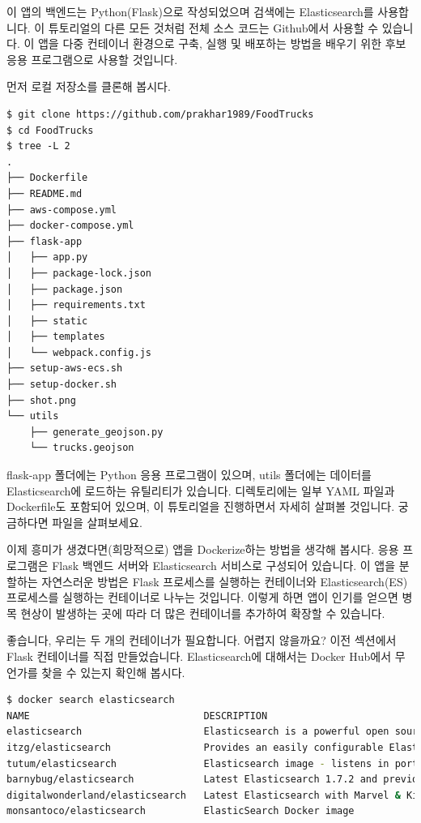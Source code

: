 이 앱의 백엔드는 Python(Flask)으로 작성되었으며 검색에는 Elasticsearch를 사용합니다. 이 튜토리얼의 다른 모든 것처럼 전체 소스 코드는 Github에서 사용할 수 있습니다. 이 앱을 다중 컨테이너 환경으로 구축, 실행 및 배포하는 방법을 배우기 위한 후보 응용 프로그램으로 사용할 것입니다.

먼저 로컬 저장소를 클론해 봅시다.
\begin{verbatim}
$ git clone https://github.com/prakhar1989/FoodTrucks
$ cd FoodTrucks
$ tree -L 2
.
├── Dockerfile
├── README.md
├── aws-compose.yml
├── docker-compose.yml
├── flask-app
│   ├── app.py
│   ├── package-lock.json
│   ├── package.json
│   ├── requirements.txt
│   ├── static
│   ├── templates
│   └── webpack.config.js
├── setup-aws-ecs.sh
├── setup-docker.sh
├── shot.png
└── utils
    ├── generate_geojson.py
    └── trucks.geojson
\end{verbatim}

flask-app 폴더에는 Python 응용 프로그램이 있으며, utils 폴더에는 데이터를 Elasticsearch에 로드하는 유틸리티가 있습니다. 디렉토리에는 일부 YAML 파일과 Dockerfile도 포함되어 있으며, 이 튜토리얼을 진행하면서 자세히 살펴볼 것입니다. 궁금하다면 파일을 살펴보세요.

이제 흥미가 생겼다면(희망적으로) 앱을 Dockerize하는 방법을 생각해 봅시다. 응용 프로그램은 Flask 백엔드 서버와 Elasticsearch 서비스로 구성되어 있습니다. 이 앱을 분할하는 자연스러운 방법은 Flask 프로세스를 실행하는 컨테이너와 Elasticsearch(ES) 프로세스를 실행하는 컨테이너로 나누는 것입니다. 이렇게 하면 앱이 인기를 얻으면 병목 현상이 발생하는 곳에 따라 더 많은 컨테이너를 추가하여 확장할 수 있습니다.

좋습니다, 우리는 두 개의 컨테이너가 필요합니다. 어렵지 않을까요? 이전 섹션에서 Flask 컨테이너를 직접 만들었습니다. Elasticsearch에 대해서는 Docker Hub에서 무언가를 찾을 수 있는지 확인해 봅시다.
\begin{lstlisting}[language=bash]
$ docker search elasticsearch
NAME                              DESCRIPTION                                     STARS     OFFICIAL   AUTOMATED
elasticsearch                     Elasticsearch is a powerful open source se...   697       [OK]
itzg/elasticsearch                Provides an easily configurable Elasticsea...   17                   [OK]
tutum/elasticsearch               Elasticsearch image - listens in port 9200.     15                   [OK]
barnybug/elasticsearch            Latest Elasticsearch 1.7.2 and previous re...   15                   [OK]
digitalwonderland/elasticsearch   Latest Elasticsearch with Marvel & Kibana       12                   [OK]
monsantoco/elasticsearch          ElasticSearch Docker image                      9                    [OK]
\end{lstlisting}

